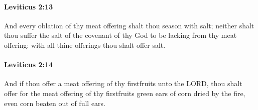 		\paragraph{Leviticus 2:13} %
			\label{LEVITICUS-2-13}

			And every oblation of thy meat offering shalt thou season with salt; neither shalt thou suffer the salt of the covenant of thy God to be lacking from thy meat offering: with all thine offerings thou shalt offer salt.


		\paragraph{Leviticus 2:14} %
			\label{LEVITICUS-2-14}

			And if thou offer a meat offering of thy firstfruits unto the LORD, thou shalt offer for the meat offering of thy firstfruits green ears of corn dried by the fire, even corn beaten out of full ears.

